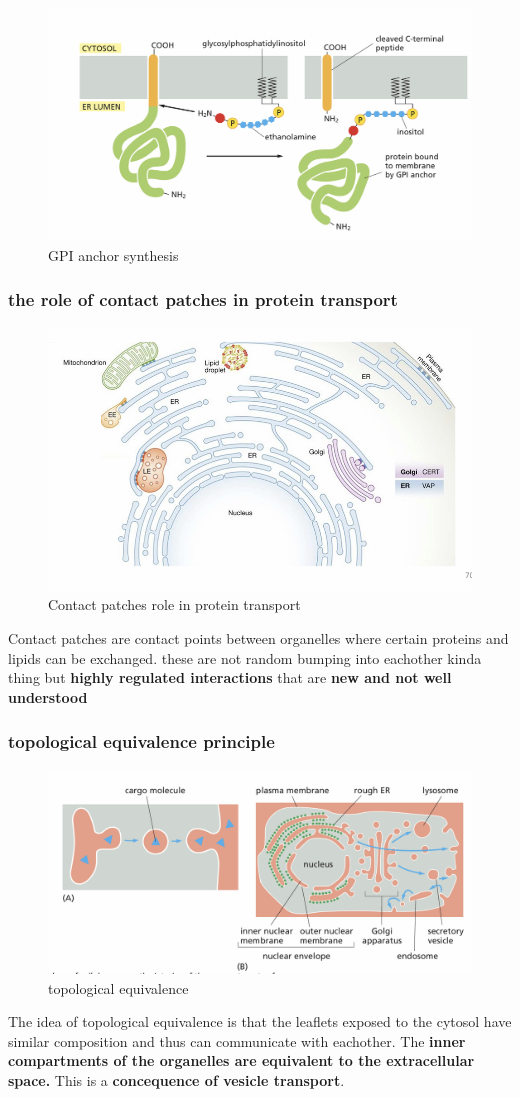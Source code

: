 \documentclass[../main.tex]{subfiles}
\begin{document}
\begin{figure}[H]
    \centering
    \includegraphics[width=0.5\linewidth]{GPI.png}
    \caption{GPI anchor synthesis}
    \label{fig:enter-label}
\end{figure}

\subsubsection{the role of contact patches in protein transport}
\begin{figure}[H]
    \centering
    \includegraphics[width=0.5\linewidth]{Sum_Cell_Bio_II//lectures//cbII4/contact.png}
    \caption{Contact patches role in protein transport}
    \label{fig:enter-label}
\end{figure}
Contact patches are contact points between organelles where certain proteins and lipids can be exchanged. these are not random bumping into eachother kinda thing but \textbf{highly regulated interactions} that are \textbf{new and not well understood}

\subsubsection{topological equivalence principle}
\begin{figure}[H]
    \centering
    \includegraphics[width=0.5\linewidth]{Sum_Cell_Bio_II//lectures//cbII4/topologicalEquivalence.png}
    \caption{topological equivalence}
    \label{fig:enter-label}
\end{figure}
The idea of topological equivalence is that the leaflets exposed to the cytosol have similar composition and thus can communicate with eachother. The \textbf{inner compartments of the organelles are equivalent to the extracellular space.} This is a \textbf{concequence of vesicle transport}.
\par
\end{document}
